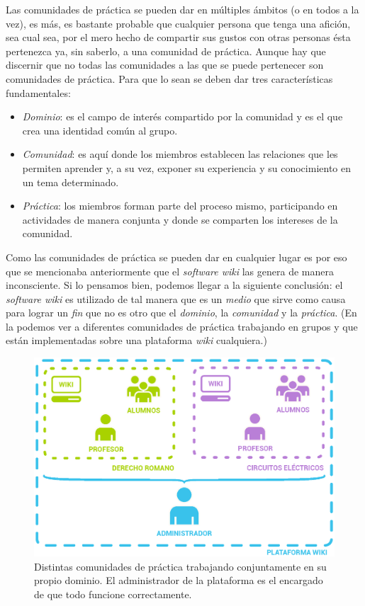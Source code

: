 Las comunidades de práctica se pueden dar en múltiples ámbitos (o en todos a la vez), es más, es bastante probable que cualquier persona que tenga una afición, sea cual sea, por el mero hecho de compartir sus gustos con otras personas ésta pertenezca ya, sin saberlo, a una comunidad de práctica. Aunque hay que discernir que no todas las comunidades a las que se puede pertenecer son comunidades de práctica. Para que lo sean se deben dar tres características fundamentales:

\begin{itemize}
\item \textit{Dominio}: es el campo de interés compartido por la comunidad y es el que crea una identidad común al grupo.

\item \textit{Comunidad}: es aquí donde los miembros establecen las relaciones que les permiten aprender y, a su vez, exponer su experiencia y su conocimiento en un tema determinado.

\item \textit{Práctica}: los miembros forman parte del proceso mismo, participando en actividades de manera conjunta y donde se comparten los intereses de la comunidad.
\end{itemize}

Como las comunidades de práctica se pueden dar en cualquier lugar es por eso que se mencionaba anteriormente que el \textit{software wiki} las genera de manera inconsciente. Si lo pensamos bien, podemos llegar a la siguiente conclusión: el \textit{software wiki} es utilizado de tal manera que es un \textit{medio} que sirve como causa para lograr un \textit{fin} que no es otro que el \textit{dominio}, la \textit{comunidad} y la \textit{práctica}. (En la  podemos ver a diferentes comunidades de práctica trabajando en grupos y que están implementadas sobre una plataforma \textit{wiki} cualquiera.)

\begin{figure}
\centering
\includegraphics[width=\linewidth]{../graphics/fig_comunidades_de_practica.eps}
\caption{Distintas comunidades de práctica trabajando conjuntamente en su propio dominio. El administrador de la plataforma es el encargado de que todo funcione correctamente.}\label{fig:comunidades_de_practica}
\end{figure}

